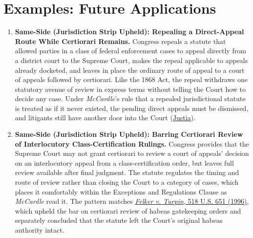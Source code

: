 \documentclass[12pt]{article}
\begin{document}
\section{Examples: Future Applications}
\begin{enumerate}

\item \textbf{Same-Side (Jurisdiction Strip Upheld): Repealing a Direct-Appeal Route While Certiorari Remains.} Congress repeals a statute that allowed parties in a class of federal enforcement cases to appeal directly from a district court to the Supreme Court, makes the repeal applicable to appeals already docketed, and leaves in place the ordinary route of appeal to a court of appeals followed by certiorari. Like the 1868 Act, the repeal withdraws one statutory avenue of review in express terms without telling the Court how to decide any case. Under \textit{McCardle}'s rule that a repealed jurisdictional statute is treated as if it never existed, the pending direct appeals must be dismissed, and litigants still have another door into the Court (\href{https://supreme.justia.com/cases/federal/us/74/506/}{Justia}).

\item \textbf{Same-Side (Jurisdiction Strip Upheld): Barring Certiorari Review of Interlocutory Class-Certification Rulings.} Congress provides that the Supreme Court may not grant certiorari to review a court of appeals' decision on an interlocutory appeal from a class-certification order, but leaves full review available after final judgment. The statute regulates the timing and route of review rather than closing the Court to a category of cases, which places it comfortably within the Exceptions and Regulations Clause as \textit{McCardle} read it. The pattern matches \href{https://supreme.justia.com/cases/federal/us/518/651/}{\textit{Felker v. Turpin}, 518 U.S. 651 (1996)}, which upheld the bar on certiorari review of habeas gatekeeping orders and separately concluded that the statute left the Court's original habeas authority intact.


\end{enumerate}
\end{document}
